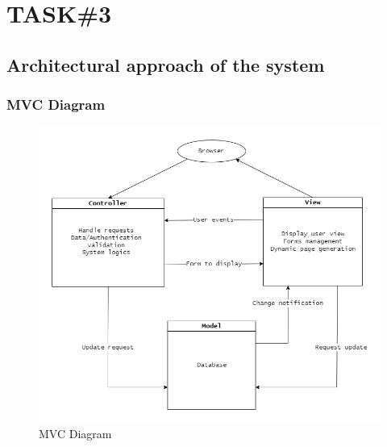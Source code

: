 \documentclass[a4paper, 13pt]{article}
\begin{document}
\newpage
\section{TASK\#3}
\subsection{Architectural approach of the system}
\subsubsection*{MVC Diagram}
\begin{figure}[!ht]
        \centering
        \includegraphics[scale=0.5]{architecture-design/diagramMVC.png}
        \caption{MVC Diagram}
        \label{fig:my_label}
    \end{figure}
\newpage
\end{document}
